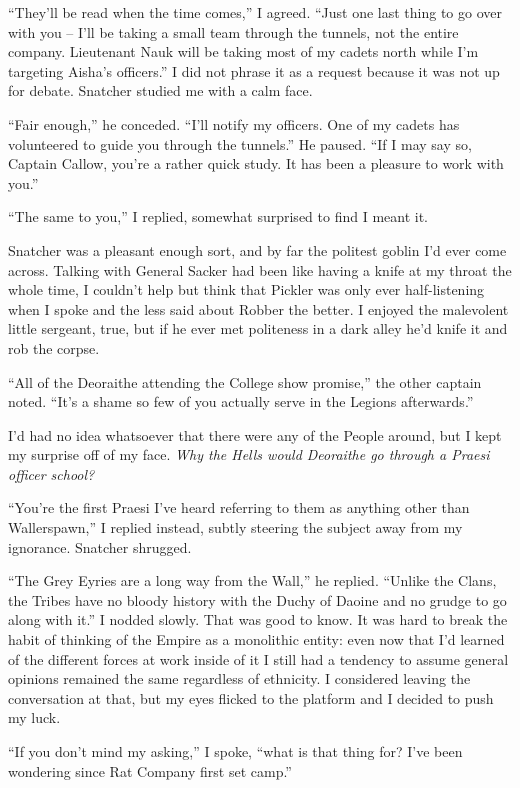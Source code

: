 \documentclass[12pt, openany]{book}
\begin{document}
“They’ll be read when the time comes,” I agreed. “Just one last thing to go over with you – I’ll be taking a small team through the tunnels, not the entire company. Lieutenant Nauk will be taking most of my cadets north while I’m targeting Aisha’s officers.”
I did not phrase it as a request because it was not up for debate. Snatcher studied me with a calm face.

“Fair enough,” he conceded. “I’ll notify my officers. One of my cadets has volunteered to guide you through the tunnels.” He paused. “If I may say so, Captain Callow, you’re a rather quick study. It has been a pleasure to work with you.”

“The same to you,” I replied, somewhat surprised to find I meant it.

Snatcher was a pleasant enough sort, and by far the politest goblin I’d ever come across. Talking with General Sacker had been like having a knife at my throat the whole time, I couldn’t help but think that Pickler was only ever half-listening when I spoke and the less said about Robber the better. I enjoyed the malevolent little sergeant, true, but if he ever met politeness in a dark alley he’d knife it and rob the corpse.

“All of the Deoraithe attending the College show promise,” the other captain noted. “It’s a shame so few of you actually serve in the Legions afterwards.”

I’d had no idea whatsoever that there were any of the People around, but I kept my surprise off of my face. \textit{Why the Hells would Deoraithe go through a Praesi officer school?}

“You’re the first Praesi I’ve heard referring to them as anything other than Wallerspawn,” I replied instead, subtly steering the subject away from my ignorance.
Snatcher shrugged.

“The Grey Eyries are a long way from the Wall,” he replied. “Unlike the Clans, the Tribes have no bloody history with the Duchy of Daoine and no grudge to go along with it.”
I nodded slowly. That was good to know. It was hard to break the habit of thinking of the Empire as a monolithic entity: even now that I’d learned of the different forces at work inside of it I still had a tendency to assume general opinions remained the same regardless of ethnicity. I considered leaving the conversation at that, but my eyes flicked to the platform and I decided to push my luck.

“If you don’t mind my asking,” I spoke, “what is that thing for? I’ve been wondering since Rat Company first set camp.”
\end{document}
